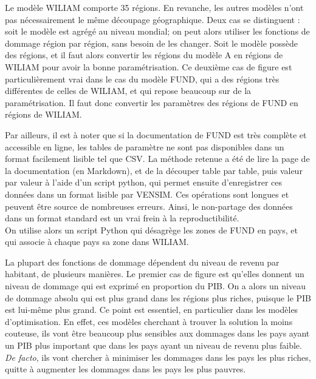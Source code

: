\begin{methodbox}

    Le modèle WILIAM comporte 35 régions. En revanche, les autres modèles n'ont pas nécessairement le même découpage géographique. Deux cas se distinguent : soit le modèle est agrégé au niveau mondial; on peut alors utiliser les fonctions de dommage région par région, sans besoin de les changer. Soit le modèle possède des régions, et il faut alors convertir les régions du modèle A en régions de WILIAM pour avoir la bonne paramétrisation. Ce deuxième cas de figure est particulièrement vrai dans le cas du modèle FUND, qui a des régions très différentes de celles de WILIAM, et qui repose beaucoup sur de la paramétrisation. Il faut donc convertir les paramètres des régions de FUND en régions de WILIAM. 

    Par ailleurs, il est à noter que si la documentation de FUND est très complète et accessible en ligne, les tables de paramètre ne sont pas disponibles dans un format facilement lisible tel que CSV. La méthode retenue a été de lire la page de la documentation (en Markdown), et de la découper table par table, puis valeur par valeur à l'aide d'un script python, qui permet ensuite d'enregistrer ces données dans un format lisible par VENSIM. Ces opérations sont longues et peuvent être source de nombreuses erreurs. Ainsi, le non-partage des données dans un format standard est un vrai frein à la reproductibilité. \\
    
    On utilise alors un script Python qui désagrège les zones de FUND en pays, et qui associe à chaque pays sa zone dans WILIAM. 
    
\end{methodbox}

La plupart des fonctions de dommage dépendent du niveau de revenu par habitant, de plusieurs manières. Le premier cas de figure est qu'elles donnent un niveau de dommage qui est exprimé en proportion du PIB. On a alors un niveau de dommage absolu qui est plus grand dans les régions plus riches, puisque le PIB est lui-même plus grand. Ce point est essentiel, en particulier dans les modèles d'optimisation. En effet, ces modèles cherchant à trouver la solution la moins couteuse, ils vont être beaucoup plus sensibles aux dommages dans les pays ayant un PIB plus important que dans les pays ayant un niveau de revenu plus faible. \emph{De facto}, ils vont chercher à minimiser les dommages dans les pays les plus riches, quitte à augmenter les dommages dans les pays les plus pauvres. \\

